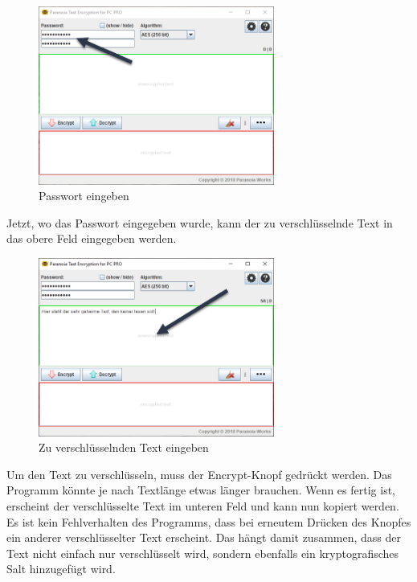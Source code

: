 \documentclass[12pt,a4paper]{scrreprt}
\begin{document}
\begin{figure}[h]
\begin{center}
\includegraphics[width=220pt]{media/pte1.png}
\caption{Passwort eingeben}
\label{pte1}
\end{center}
\end{figure}

\noindent Jetzt, wo das Passwort eingegeben wurde, kann der zu verschlüsselnde Text in das obere Feld eingegeben werden.

\begin{figure}[h]
\begin{center}
\includegraphics[width=220pt]{media/pte2.png}
\caption{Zu verschlüsselnden Text eingeben}
\label{pte2}
\end{center}
\end{figure}

\noindent Um den Text zu verschlüsseln, muss der Encrypt-Knopf gedrückt werden. Das Programm könnte je nach Textlänge etwas länger brauchen. Wenn es fertig ist, erscheint der verschlüsselte Text im unteren Feld und kann nun kopiert werden. Es ist kein Fehlverhalten des Programms, dass bei erneutem Drücken des Knopfes ein anderer verschlüsselter Text erscheint. Das hängt damit zusammen, dass der Text nicht einfach nur verschlüsselt wird, sondern ebenfalls ein kryptografisches Salt hinzugefügt wird.
\end{document}

